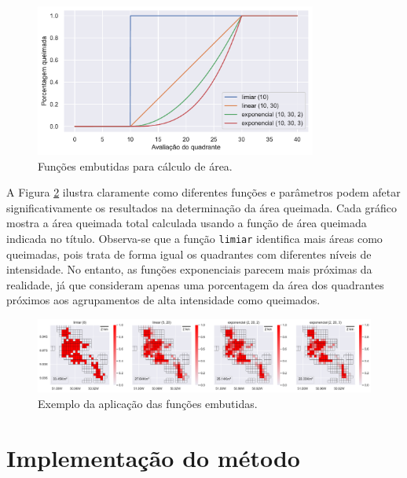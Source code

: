 \documentclass[cic,tc]{iiufrgs}
\begin{document}
\begin{figure}[H]
    \caption{Funções embutidas para cálculo de área.}
    \begin{center}
        \includegraphics[width=25em]{eval_func_built_in}
    \end{center}
    \label{fig:eval_func_built_in}
\end{figure}

A Figura \ref{fig:aplicacao_funcoes_built_in} ilustra claramente como diferentes funções e parâmetros podem afetar significativamente os resultados na determinação da área queimada. Cada gráfico mostra a área queimada total calculada usando a função de área queimada indicada no título. Observa-se que a função \texttt{limiar} identifica mais áreas como queimadas, pois trata de forma igual os quadrantes com diferentes níveis de intensidade. No entanto, as funções exponenciais parecem mais próximas da realidade, já que consideram apenas uma porcentagem da área dos quadrantes próximos aos agrupamentos de alta intensidade como queimados.

\begin{figure}[H]
    \caption{Exemplo da aplicação das funções embutidas.}
    \begin{center}
        \includegraphics[width=35em]{aplicacao_funcoes_built_in}
    \end{center}
    \label{fig:aplicacao_funcoes_built_in}
\end{figure}

\chapter{Implementação do método}
\label{chp:implementacao_metodo}
\end{document}
